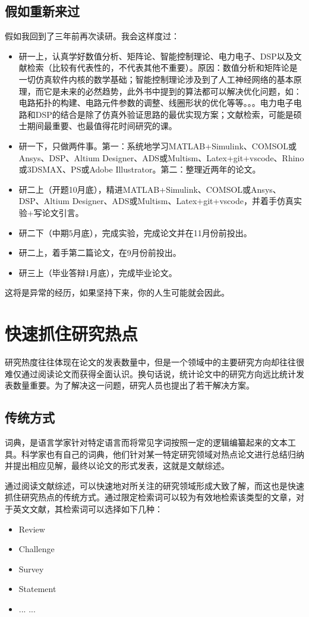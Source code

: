 \documentclass[UTF8,oneside]{ctexbook}
\begin{document}
\section{假如重新来过}
假如我回到了三年前再次读研。我会这样度过：
\begin{itemize}
	\item 研一上，认真学好数值分析、矩阵论、智能控制理论、电力电子、DSP以及文献检索（比较有代表性的，不代表其他不重要）。原因：数值分析和矩阵论是一切仿真软件内核的数学基础；智能控制理论涉及到了人工神经网络的基本原理，而它是未来的必然趋势，此外书中提到的算法都可以解决优化问题，如：电路拓扑的构建、电路元件参数的调整、线圈形状的优化等等。。。电力电子电路和DSP的结合是除了仿真外验证思路的最优实现方案；文献检索，可能是硕士期间最重要、也最值得花时间研究的课。
	\item 研一下，只做两件事。第一：系统地学习MATLAB+Simulink、COMSOL或Ansys、DSP、Altium Designer、ADS或Multism、Latex+git+vscode、Rhino或3DSMAX、PS或Adobe Illustrator。第二：整理近两年的论文。
	\item 研二上（开题10月底），精进MATLAB+Simulink、COMSOL或Ansys、DSP、Altium Designer、ADS或Multism、Latex+git+vscode，并着手仿真实验+写论文引言。
	\item 研二下（中期5月底），完成实验，完成论文并在11月份前投出。
	\item 研二上，着手第二篇论文，在9月份前投出。
	\item 研三上（毕业答辩1月底），完成毕业论文。
\end{itemize}

这将是异常的经历，如果坚持下来，你的人生可能就会因此。


\chapter{快速抓住研究热点}
研究热度往往体现在论文的发表数量中，但是一个领域中的主要研究方向却往往很难仅通过阅读论文而获得全面认识。换句话说，统计论文中的研究方向远比统计发表数量重要。为了解决这一问题，研究人员也提出了若干解决方案。

\section{传统方式}
词典，是语言学家针对特定语言而将常见字词按照一定的逻辑编纂起来的文本工具。科学家也有自己的词典，他们针对某一特定研究领域对热点论文进行总结归纳并提出相应见解，最终以论文的形式发表，这就是文献综述。

通过阅读文献综述，可以快速地对所关注的研究领域形成大致了解，而这也是快速抓住研究热点的传统方式。通过限定检索词可以较为有效地检索该类型的文章，对于英文文献，其检索词可以选择如下几种：
\begin{itemize}
	\item Review
	\item Challenge
	\item Survey
	\item Statement
	\item ... ...
\end{itemize}
\end{document}
